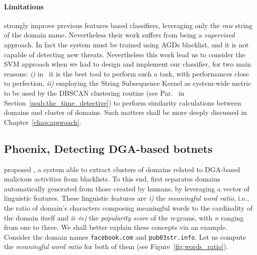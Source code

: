\paragraph{Limitations} \citet{haddadi2013} strongly improve previous features based
classifiers, leveraging only the \emph{raw} string of the domain name. Nevertheless
their work suffers from being a \emph{supervised} approach. In fact the system must
be trained using AGDs blacklist, and it is not capable of detecting new threats.
Nevertheless this work lead us to consider the SVM approach when we had to design and implement our
classifier, for two main reasons: \emph{i)} in~\cite{haddadi2013} it is the best tool to perform such a task, with performances close to
perfection, \emph{ii)} employing the String Subsequence Kernel as system-wide metric to be used by the DBSCAN clustering routine (see Par.~ in Section~\ref{ssub:the_time_detective})
to perform similarity calculations between domains and cluster of domains. Such matters
shall be more deeply discussed in Chapter~\ref{chap:approach}.

\subsection{Phoenix, Detecting DGA-based botnets} %
\label{sub:phoenix_detecting_dga_based_botnets}
\citet{schiavoni2013} proposed \phoenix, a system able to extract clusters of domains related to DGA-based
malicious activities from blacklists. To this end, \phoenix first separates
domains automatically generated from those created by humans, by leveraging a
vector of linguistic features. These linguistic features are \emph{i)} the
\emph{meaningful word ratio}, i.e., the ratio of domain's characters composing
meaningful words to the cardinality of the domain itself and \emph{ii--iv)}
the \emph{popularity score} of the \emph{n}-grams, with \emph{n} ranging from
one to three. We shall better explain these concepts via an example. Consider the
domain names \texttt{facebook.com} and \texttt{pub03str.info}. Let us compute the
\emph{meaningful word ratio} for both of them (see Figure~\ref{fig:words_ratio}).

